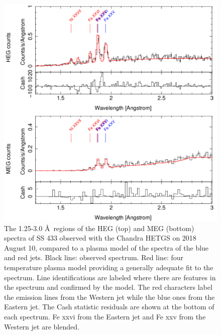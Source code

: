 \begin{figure}
    \centering
    \includegraphics[width = \linewidth]{Chapters/Figures/plasma_short1.png}
    \caption{The 1.25-3.0 \AA\ regions of the HEG (top) and MEG (bottom) spectra of SS 433 observed with the Chandra HETGS on 2018 August 10, compared to a plasma model of the spectra of the blue and red jets. Black line: observed spectrum. Red line: four temperature plasma model providing a generally adequate fit to the spectrum. Line identifications are labeled where there are features in the spectrum and confirmed by the model. The red characters label the emission lines from the Western jet while the blue ones from the Eastern jet. The Cash statistic residuals are shown at the bottom of each spectrum. Fe {\sc xxvi} from the Eastern jet and Fe {\sc xxv} from the Western jet are blended. }    \label{plasma_short1}
\end{figure}


